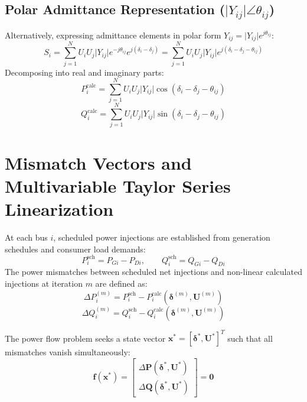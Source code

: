 \documentclass[12pt,a4paper,oneside]{report}
\begin{document}
\subsection{Polar Admittance Representation ($\vert{}Y_{ij}\vert{}\angle\theta_{ij}$)}
Alternatively, expressing admittance elements in polar form $Y_{ij} = \vert{}Y_{ij}\vert{} e^{j\theta_{ij}}$:
\begin{equation}
S_i = \sum_{j=1}^N U_i U_j \vert{}Y_{ij}\vert{} e^{-j\theta_{ij}} e^{j(\delta_i - \delta_j)} = \sum_{j=1}^N U_i U_j \vert{}Y_{ij}\vert{} e^{j(\delta_i - \delta_j - \theta_{ij})}
\end{equation}
Decomposing into real and imaginary parts:
\begin{equation}
P_i^{\text{calc}} = \sum_{j=1}^N U_i U_j \vert{}Y_{ij}\vert{} \cos(\delta_i - \delta_j - \theta_{ij})
\end{equation}
\begin{equation}
Q_i^{\text{calc}} = \sum_{j=1}^N U_i U_j \vert{}Y_{ij}\vert{} \sin(\delta_i - \delta_j - \theta_{ij})
\end{equation}

\section{Mismatch Vectors and Multivariable Taylor Series Linearization}
At each bus $i$, scheduled power injections are established from generation schedules and consumer load demands:
\begin{equation}
P_i^{\text{sch}} = P_{Gi} - P_{Di}, \qquad Q_i^{\text{sch}} = Q_{Gi} - Q_{Di}
\end{equation}
The power mismatches between scheduled net injections and non-linear calculated injections at iteration $m$ are defined as:
\begin{equation}
\Delta P_i^{(m)} = P_i^{\text{sch}} - P_i^{\text{calc}}( \boldsymbol{\delta}^{(m)}, \mathbf{U}^{(m)} )
\end{equation}
\begin{equation}
\Delta Q_i^{(m)} = Q_i^{\text{sch}} - Q_i^{\text{calc}}( \boldsymbol{\delta}^{(m)}, \mathbf{U}^{(m)} )
\end{equation}

The power flow problem seeks a state vector $\mathbf{x}^* = [\boldsymbol{\delta}^*, \mathbf{U}^*]^T$ such that all mismatches vanish simultaneously:
\begin{equation}
\mathbf{f}(\mathbf{x}^*) = \begin{bmatrix} \Delta \mathbf{P}(\boldsymbol{\delta}^*, \mathbf{U}^*) \\ \Delta \mathbf{Q}(\boldsymbol{\delta}^*, \mathbf{U}^*) \end{bmatrix} = \mathbf{0}
\end{equation}
\end{document}
